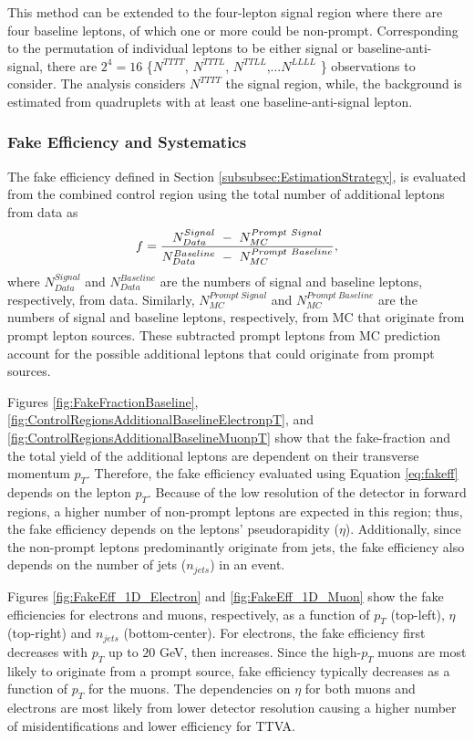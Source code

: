 This method can be extended to the four-lepton signal region where there are four baseline leptons, of which one or more could be non-prompt. Corresponding to the permutation of individual leptons to be either signal or baseline-anti-signal, there are $2^{4}=16$ \{$N^{TTTT}$, $N^{TTTL}$, $N^{TTLL}$,...$N^{LLLL}$ \} observations to consider. The analysis considers $N^{TTTT}$ the signal region, while, the background is estimated from quadruplets with at least one baseline-anti-signal lepton.

\subsubsection{Fake Efficiency and Systematics}
\label{subsubsec:FakeEff}
The fake efficiency defined in Section \ref{subsubsec:EstimationStrategy}, is evaluated from the combined control region using the total number of additional leptons from data as
\begin{equation}{\label{eq:fakeff}}
\begin{aligned}
f = \frac{ N_{Data}^{Signal}~-~N_{MC}^{Prompt~Signal}}{ N_{Data}^{Baseline}~-~N_{MC}^{Prompt~Baseline}},
\end{aligned}
\end{equation}
where $N_{Data}^{Signal}$ and $N_{Data}^{Baseline}$ are the numbers of signal and baseline leptons, respectively, from data. Similarly, $N_{MC}^{Prompt~Signal}$ and $N_{MC}^{Prompt~Baseline}$ are the numbers of signal and baseline leptons, respectively, from MC that originate from prompt lepton sources. These subtracted prompt leptons from MC prediction account for the possible additional leptons that could originate from prompt sources.

Figures \ref{fig:FakeFractionBaseline}, \ref{fig:ControlRegionsAdditionalBaselineElectronpT}, and \ref{fig:ControlRegionsAdditionalBaselineMuonpT} show that the fake-fraction and the total yield of the additional leptons are dependent on their transverse momentum $p_{T}$. Therefore, the fake efficiency evaluated using Equation \ref{eq:fakeff} depends on the lepton $p_{T}$. Because of the low resolution of the detector in forward regions, a higher number of non-prompt leptons are expected in this region; thus, the fake efficiency depends on the leptons' pseudorapidity ($\eta$). Additionally, since the non-prompt leptons predominantly originate from jets, the fake efficiency also depends on the number of jets ($n_{jets}$) in an event. 

Figures \ref{fig:FakeEff_1D_Electron} and \ref{fig:FakeEff_1D_Muon} show the fake efficiencies for electrons and muons, respectively, as a function of $p_{T}$ (top-left), $\eta$ (top-right) and $n_{jets}$ (bottom-center). For electrons, the fake efficiency first decreases with $p_{T}$ up to $20$ GeV, then increases. Since the high-$p_{T}$ muons are most likely to originate from a prompt source, fake efficiency typically decreases as a function of $p_{T}$ for the muons. The dependencies on $\eta$ for both muons and electrons are most likely from lower detector resolution causing a higher number of misidentifications and lower efficiency for TTVA.

